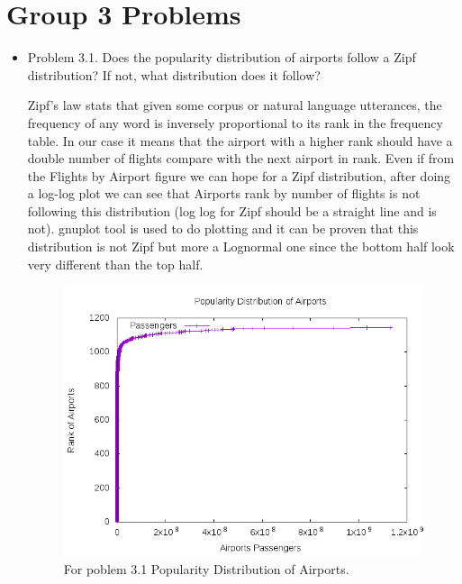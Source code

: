 \documentclass[fontsize=11pt,paper=a4]{scrartcl}
\begin{document}
\section{Group 3 Problems}
\begin{itemize}
\item Problem 3.1. Does the popularity distribution of airports follow a Zipf distribution? If not, what distribution does it follow?

Zipf’s law stats that given some corpus or natural language utterances, the frequency of any word is inversely proportional to its rank in the frequency table. In our case it means that the airport with a higher rank should have a double number of flights compare with the next airport in rank. Even if from the Flights by Airport figure we can hope for a Zipf distribution, after
doing a log-log plot we can see that Airports rank by number of flights is not following this distribution (log log for Zipf should be a straight line and is not). gnuplot tool is used to do plotting and it can be proven that this distribution is not Zipf but more a Lognormal one since the bottom half look very different than the top half. 

\begin{figure}
\centering
\includegraphics[totalheight=8cm]{airport_rank.png}
\caption{For poblem 3.1 Popularity Distribution of Airports.}
\label{fig:verticalcell}
\end{figure}


\end{itemize}
\end{document}
